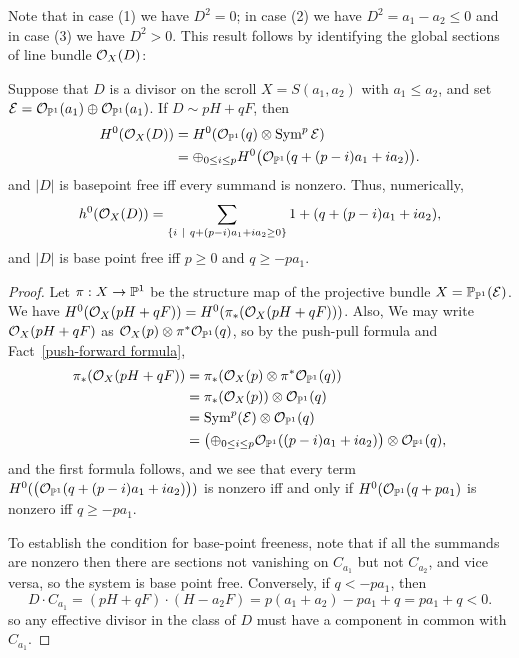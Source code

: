 Note that in case (1) we have $D^{2} = 0$; in case (2) we have $D^{2}= a_{1}-a_{2}\leq 0$ and in case (3) we have $D^{2}>0$.
This result follows by identifying the global sections of line bundle $\sO_{X}(D)$:

\begin{theorem}\label{global sections}
Suppose that $D$ is a divisor on the scroll $X = S(a_{1}, a_{2})$ with $a_{1}\leq a_{2}$, and
set $\sE = \sO_{\PP^{1}}(a_{1})\oplus \sO_{\PP^{1}}(a_{1})$.   If $D \sim pH+qF$, then 
\begin{align*}
 H^{0}(\sO_{X}(D)) &= H^{0}(\sO_{\PP^{1}}(q) \otimes \Sym^{p} \sE)\\
 &= 
\oplus_{0\leq i\leq p}H^{0}\bigl(\sO_{\PP^{1}}(q + (p-i)a_{1}+i a_{2})\bigr).
\end{align*}
and $|D|$ is basepoint free iff every summand is nonzero.
Thus, numerically,
$$
h^{0}(\sO_{X}(D)) = 
\sum_{\{i\ \mid\ q+(p-i)a_{1}+i a_{2} \geq 0\}}1+(q + (p-i)a_{1}+i a_{2}),
$$
and
$|D|$ is base point free iff $p\geq 0$ and $q\geq -pa_{1}$.
\end{theorem}

\begin{proof} Let $\pi:X\to \PP^{1}$ be the structure map of the projective bundle $X = \PP_{\PP^{1}}(\sE)$.
We have $H^{0}(\sO_{X}(pH+qF)) = H^{0}(\pi_{*}(\sO_{X}(pH+qF)))$. Also, 
We may write $\sO_{X}(pH+qF)$ as $\sO_{X}(p) \otimes \pi^{*}\sO_{\PP^{1}}(q)$, so by the push-pull formula
and Fact~\ref{push-forward formula},
\begin{align*}
\pi_{*}(\sO_{X}(pH+qF)) &= \pi_{*}(\sO_{X}(p) \otimes \pi^{*}\sO_{\PP^{1}}(q)) \\
 &= \pi_{*}(\sO_{X}(p))\otimes \sO_{\PP^{1}}(q)\\
&=  \Sym^{p}(\sE)\otimes \sO_{\PP^{1}}(q)\\
&=  \bigl(\oplus_{0\leq i\leq p} \sO_{\PP^{1}}((p-i)a_{1}+i a_{2})\bigr) \otimes \sO_{\PP^{1}}(q),
\end{align*}
and the first formula follows, and we see that every term 
$H^{0}(\bigl(\sO_{\PP^{1}}(q + (p-i)a_{1}+i a_{2})\bigr))$ is nonzero iff and only if 
$H^{0}(\sO_{\PP^{1}}(q + pa_{1})$ is nonzero iff $q\geq -pa_{1}$.

To establish the condition for base-point freeness, note that if all the summands are nonzero then
there are sections not vanishing on $C_{a_{1}}$ but not $C_{a_{2}}$, and vice versa, so the system is base point free. Conversely, if $q<-pa_{1}$, then 
$$
D\cdot C_{a_{1}} = (pH+qF) \cdot (H-a_{2}F) = p(a_{1}+a_{2}) -pa_{1}+q = pa_{1}+q < 0.
$$
so any effective divisor in the class of $D$ must have a component in common with $C_{a_{1}}$.
\end{proof}


